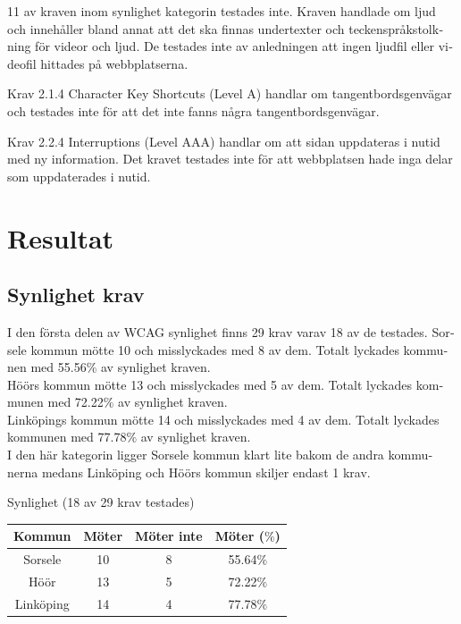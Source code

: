 \documentclass[11p]{article}
\begin{document}
\begin{otherlanguage}{swedish}
    11 av kraven inom synlighet kategorin testades inte.
    Kraven handlade om ljud och innehåller bland annat att det ska finnas undertexter och teckenspråkstolkning för videor och ljud.
    De testades inte av anledningen att ingen ljudfil eller videofil hittades på webbplatserna.

    Krav 2.1.4 Character Key Shortcuts (Level A) handlar om tangentbordsgenvägar och testades inte för att det inte fanns några tangentbordsgenvägar.

    Krav 2.2.4 Interruptions (Level AAA) handlar om att sidan uppdateras i nutid med ny information.
    Det kravet testades inte för att webbplatsen hade inga delar som uppdaterades i nutid.

    \section{Resultat} %



    \subsection{Synlighet krav}
    I den första delen av WCAG synlighet finns 29 krav varav 18 av de testades.
    Sorsele kommun mötte 10 och misslyckades med 8 av dem.
    Totalt lyckades kommunen med 55.56$\%$ av synlighet kraven.
    \\Höörs kommun mötte 13 och misslyckades med 5 av dem.
    Totalt lyckades kommunen med 72.22$\%$ av synlighet kraven.
    \\Linköpings kommun mötte 14 och misslyckades med 4 av dem.
    Totalt lyckades kommunen med 77.78$\%$ av synlighet kraven.
    \\I den här kategorin ligger Sorsele kommun klart lite bakom de andra kommunerna medans Linköping och Höörs kommun skiljer endast 1 krav.

    \newpage
    \begin{center}
    Synlighet (18 av 29 krav testades)

    \begin{tabular}{ |c|c|c|c|}
        \hline
        Kommun & Möter & Möter inte & Möter ($\%$) \\  \hline
        Sorsele & 10 & 8 & 55.64$\%$ \\ \hline
        Höör & 13 & 5 & 72.22$\%$ \\ \hline
        Linköping & 14 & 4 & 77.78$\%$ \\ \hline
    \end{tabular}
    \end{center}


\end{otherlanguage}
\end{document}
